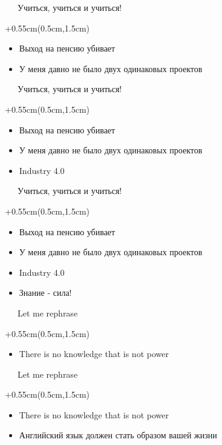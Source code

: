 \documentclass[xetex,18pt,aspectratio=169]{beamer}
\begin{document}
\begin{Large}
\begin{frame}{\ \ \ Учиться, учиться и учиться!}
\begin{textblock*}{\framewidth+0.55cm}(0.5cm,1.5cm)
\begin{itemize}
  \item Выход на пенсию убивает
  \item У меня давно не было двух одинаковых проектов
\end{itemize}
\end{textblock*}
\end{frame}

\begin{frame}{\ \ \ Учиться, учиться и учиться!}
\begin{textblock*}{\framewidth+0.55cm}(0.5cm,1.5cm)
\begin{itemize}
  \item Выход на пенсию убивает
  \item У меня давно не было двух одинаковых проектов
  \item Industry 4.0
\end{itemize}
\end{textblock*}
\end{frame}

\begin{frame}{\ \ \ Учиться, учиться и учиться!}
\begin{textblock*}{\framewidth+0.55cm}(0.5cm,1.5cm)
\begin{itemize}
  \item Выход на пенсию убивает
  \item У меня давно не было двух одинаковых проектов
  \item Industry 4.0
  \item Знание - сила!
\end{itemize}
\end{textblock*}
\end{frame}

\begin{frame}{\ \ \ Let me rephrase}
\begin{textblock*}{\framewidth+0.55cm}(0.5cm,1.5cm)
\begin{itemize}
  \item There is no knowledge that is not power
\end{itemize}
\end{textblock*}
\end{frame}

\begin{frame}{\ \ \ Let me rephrase}
\begin{textblock*}{\framewidth+0.55cm}(0.5cm,1.5cm)
\begin{itemize}
  \item There is no knowledge that is not power
  \item Английский язык должен стать образом вашей жизни
\end{itemize}
\end{textblock*}
\end{frame}


\end{Large}
\end{document}
